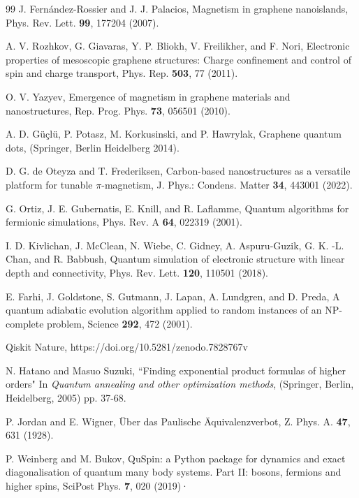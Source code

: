 \documentclass[twocolumn,superscriptaddress,amsmath,amssymb,showpacs,floatfix,preprintnumbers]{revtex4-1}
\begin{document}
\begin{thebibliography}{99}
J. Fern\'andez-Rossier and J. J. Palacios,
Magnetism in graphene nanoislands,
Phys. Rev. Lett. \textbf{99}, 177204 (2007).

A. V. Rozhkov, G. Giavaras, Y. P. Bliokh, V. Freilikher, and F. Nori,
Electronic properties of mesoscopic graphene structures: Charge confinement and control of spin and charge transport,
Phys. Rep. \textbf{503}, 77 (2011).

O. V. Yazyev, 
Emergence of magnetism in graphene materials and nanostructures,
Rep. Prog. Phys. \textbf{73}, 056501 (2010).

A. D. G\"{u}\c{c}l\"{u}, P. Potasz, M. Korkusinski, and P. Hawrylak,
Graphene quantum dots,
(Springer, Berlin Heidelberg 2014).

D. G. de Oteyza and T. Frederiksen,
Carbon-based nanostructures as a versatile platform for tunable $\pi$-magnetism,
J. Phys.: Condens. Matter \textbf{34}, 443001 (2022).

G. Ortiz, J. E. Gubernatis, E. Knill, and R. Laflamme,
Quantum algorithms for fermionic simulations,
Phys. Rev. A \textbf{64}, 022319 (2001).


I. D. Kivlichan, J. McClean, N. Wiebe, C. Gidney, A. Aspuru-Guzik, G. K. -L. Chan, and R. Babbush, 
Quantum simulation of electronic structure with linear depth and connectivity,
Phys. Rev. Lett. \textbf{120}, 110501 (2018).

E. Farhi, J. Goldstone, S. Gutmann, J. Lapan, A. Lundgren, and D. Preda, 
A quantum adiabatic evolution algorithm applied to random instances of an NP-complete problem,
Science \textbf{292}, 472 (2001).

Qiskit Nature, https://doi.org/10.5281/zenodo.7828767v

N. Hatano and Masuo Suzuki,
``Finding exponential product formulas of higher orders" 
In \textit{Quantum annealing and other optimization methods}, 
(Springer, Berlin, Heidelberg, 2005) pp. 37-68.

P. Jordan and E. Wigner, 
\"{U}ber das Paulische \"{A}quivalenzverbot,
Z. Phys. A. \textbf{47}, 631 (1928).

P. Weinberg and M. Bukov,
QuSpin: a Python package for dynamics and exact diagonalisation of quantum many body systems. 
Part II: bosons, fermions and higher spins,
SciPost Phys. \textbf{7}, 020 (2019)·

\end{thebibliography} 
 
\end{document}
